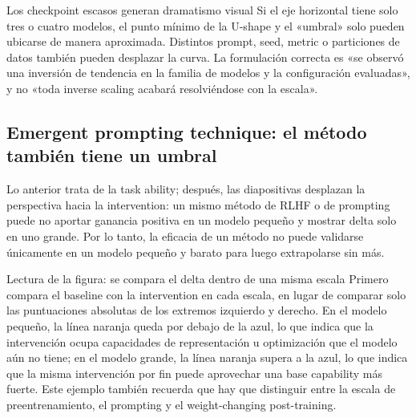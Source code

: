 \begin{warningbox}{Los checkpoint escasos generan dramatismo visual}
Si el eje horizontal tiene solo tres o cuatro modelos, el punto mínimo de la U-shape y el «umbral» solo pueden ubicarse de manera aproximada. Distintos prompt, seed, metric o particiones de datos también pueden desplazar la curva. La formulación correcta es «se observó una inversión de tendencia en la familia de modelos y la configuración evaluadas», y no «toda inverse scaling acabará resolviéndose con la escala».
\end{warningbox}

\subsection{Emergent prompting technique: el método también tiene un umbral}

Lo anterior trata de la task ability; después, las diapositivas desplazan la perspectiva hacia la intervention: un mismo método de RLHF o de prompting puede no aportar ganancia positiva en un modelo pequeño y mostrar delta solo en uno grande. Por lo tanto, la eficacia de un método no puede validarse únicamente en un modelo pequeño y barato para luego extrapolarse sin más.


\begin{knowledgebox}{Lectura de la figura: se compara el delta dentro de una misma escala}
Primero compara el baseline con la intervention en cada escala, en lugar de comparar solo las puntuaciones absolutas de los extremos izquierdo y derecho. En el modelo pequeño, la línea naranja queda por debajo de la azul, lo que indica que la intervención ocupa capacidades de representación u optimización que el modelo aún no tiene; en el modelo grande, la línea naranja supera a la azul, lo que indica que la misma intervención por fin puede aprovechar una base capability más fuerte. Este ejemplo también recuerda que hay que distinguir entre la escala de preentrenamiento, el prompting y el weight-changing post-training.
\end{knowledgebox}



